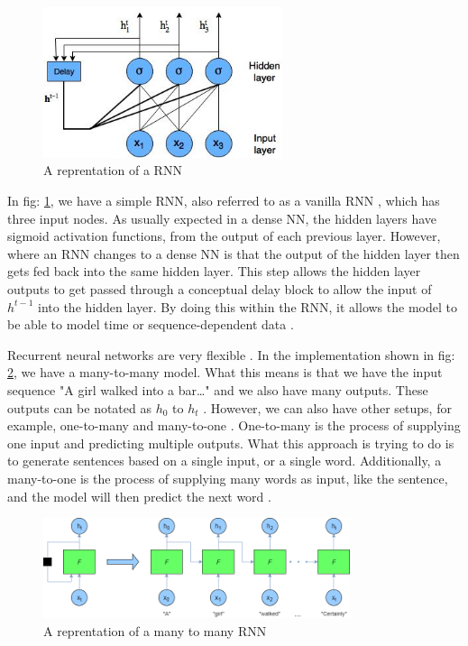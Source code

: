 \documentclass[a4paper,10pt]{article}
\begin{document}
	\begin{figure}
		\begin{center}
			\includegraphics[width=7cm]{explicit_RNN.jpg}
			\caption{A reprentation of a RNN \cite{adv_in_ml}}
			\label{fig:rnn_diagram}
		\end{center}
	\end{figure} 
	
	In fig: \ref{fig:rnn_diagram}, we have a simple RNN, also referred to as a vanilla RNN \cite{geron2019hands}, which has three input nodes. As usually expected in a dense NN, the hidden layers have sigmoid activation functions, from the output of each previous layer. However, where an RNN changes to a dense NN is that the output of the hidden layer then gets fed back into the same hidden layer. This step allows the hidden layer outputs to get passed through a conceptual delay block to allow the input of $h^{t-1}$ into the hidden layer. By doing this within the RNN, it allows the model to be able to model time or sequence-dependent data \cite{adv_in_ml, geron2019hands}.
	
	Recurrent neural networks are very flexible \cite{geron2019hands}. In the implementation shown in fig: \ref{fig:m2m_rnn_diagram}, we have a many-to-many model. What this means is that we have the input sequence "A girl walked into a bar…" and we also have many outputs. These outputs can be notated as $h_0$ to $h_t$ \cite{adv_in_ml}. However, we can also have other setups, for example, one-to-many and many-to-one \cite{jjslides}.  One-to-many is the process of supplying one input and predicting multiple outputs. What this approach is trying to do is to generate sentences based on a single input, or a single word. Additionally, a many-to-one is the process of supplying many words as input, like the sentence, and the model will then predict the next word \cite{adv_in_ml}.
	
	\begin{figure}
		\begin{center}
			\includegraphics[width=9cm]{Recurrent-neural-network.png}
			\caption{A reprentation of a many to many RNN \cite{adv_in_ml}}
			\label{fig:m2m_rnn_diagram}
		\end{center}
	\end{figure} 
	
\end{document}

